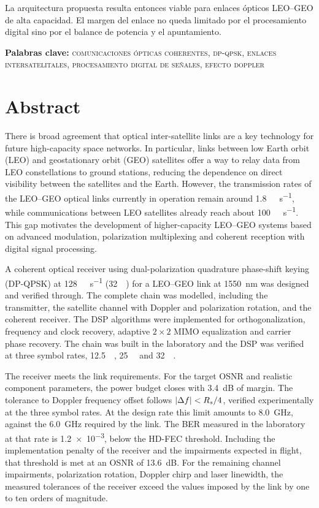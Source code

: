 La arquitectura propuesta resulta entonces viable para enlaces \'opticos
LEO--GEO de alta capacidad. El margen del enlace no queda limitado por el
procesamiento digital sino por el balance de potencia y el apuntamiento.

\vspace{1.5em}
\noindent\textbf{Palabras clave:}
\textsc{comunicaciones \'opticas coherentes, dp-qpsk, enlaces intersatelitales,
procesamiento digital de se\~nales, efecto doppler}

\cleardoublepage

\chapter*{Abstract}

There is broad agreement that optical inter-satellite links are a key
technology for future high-capacity space networks. In particular, links
between low Earth orbit (LEO) and geostationary orbit (GEO) satellites offer a
way to relay data from LEO constellations to ground stations, reducing the
dependence on direct visibility between the satellites and the Earth. However,
the transmission rates of the LEO--GEO optical links currently in operation
remain around \SI{1.8}{\giga\bit\per\second}, while communications between LEO
satellites already reach about \SI{100}{\giga\bit\per\second}. This gap
motivates the development of higher-capacity LEO--GEO systems based on advanced
modulation, polarization multiplexing and coherent reception with digital
signal processing.

A coherent optical receiver using dual-polarization quadrature phase-shift
keying (DP-QPSK) at \SI{128}{\giga\bit\per\second} (\SI{32}{\giga\baud}) for a
LEO--GEO link at \SI{1550}{\nano\metre} was designed and verified through. The
complete chain was modelled, including the transmitter, the satellite channel
with Doppler and polarization rotation, and the coherent receiver. The DSP
algorithms were implemented for orthogonalization, frequency and clock
recovery, adaptive $2\times2$ MIMO equalization and carrier phase recovery. The
chain was built in the laboratory and the DSP was verified at three symbol
rates, \SI{12.5}{\giga\baud}, \SI{25}{\giga\baud} and \SI{32}{\giga\baud}.

The receiver meets the link requirements. For the target OSNR and realistic
component parameters, the power budget closes with \SI{3.4}{\dB} of margin. The
tolerance to Doppler frequency offset follows $\left\lvert \Delta f \right\rvert < R_{s}/4$, verified
experimentally at the three symbol rates. At the design rate this limit amounts
to \SI{8.0}{\giga\hertz}, against the \SI{6.0}{\giga\hertz} required by the
link. The BER measured in the laboratory at that rate is \num{1.2e-3}, below
the HD-FEC threshold. Including the implementation penalty of the receiver and
the impairments expected in flight, that threshold is met at an OSNR of
\SI{13.6}{\dB}. For the remaining channel impairments, polarization rotation,
Doppler chirp and laser linewidth, the measured tolerances of the receiver
exceed the values imposed by the link by one to ten orders of magnitude.

